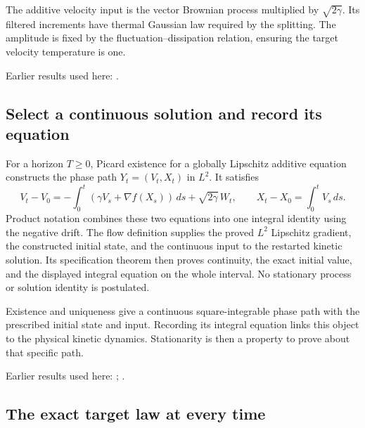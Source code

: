 \documentclass[11pt,a4paper]{report}
\begin{document}
The additive velocity input is the vector Brownian process multiplied by \(\sqrt{2\gamma}\). Its filtered increments have thermal Gaussian law required by the splitting. The amplitude is fixed by the fluctuation–dissipation relation, ensuring the target velocity temperature is one.



Earlier results used here: \cite[Section~3.13.2]{LangevinLean2026ULASC}.
\subsection{\texorpdfstring{Select a continuous solution and record its equation}{Select a continuous solution and record its equation}}
\label{report-step-KineticLangevin-CanonicalStationarity-lean-4}


For a horizon \(T\ge0\), Picard existence for a globally Lipschitz additive equation constructs the phase path \(Y_t=(V_t,X_t)\) in \(L^{2}\). It satisfies \[V_t-V_0=-\int_0^t(\gamma V_s+\nabla f(X_s))\,ds+\sqrt{2\gamma}\,W_t,\qquad X_t-X_0=\int_0^t V_s\,ds.\] Product notation combines these two equations into one integral identity using the negative drift. The flow definition supplies the proved \(L^{2}\) Lipschitz gradient, the constructed initial state, and the continuous input to the restarted kinetic solution. Its specification theorem then proves continuity, the exact initial value, and the displayed integral equation on the whole interval. No stationary process or solution identity is postulated.



Existence and uniqueness give a continuous square-integrable phase path with the prescribed initial state and input. Recording its integral equation links this object to the physical kinetic dynamics. Stationarity is then a property to prove about that specific path.



Earlier results used here: \cite[Section~3.13.2]{LangevinLean2026ULASC}; \cite[Section~3.13.5]{LangevinLean2026ULASC}.
\subsection{\texorpdfstring{The exact target law at every time}{The exact target law at every time}}
\label{report-step-KineticLangevin-CanonicalStationarity-lean-5}
\end{document}
